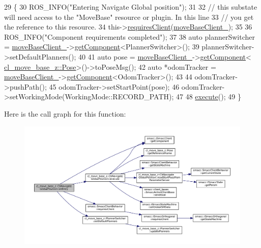 \begin{DoxyCode}
29     \{
30         ROS\_INFO(\textcolor{stringliteral}{"Entering Navigate Global position"});
31 
32         \textcolor{comment}{// this substate will need access to the "MoveBase" resource or plugin. In this line}
33         \textcolor{comment}{// you get the reference to this resource.}
34         this->\hyperlink{classsmacc_1_1SmaccClientBehavior_a917f001e763a1059af337bf4e164f542}{requiresClient}(\hyperlink{classcl__move__base__z_1_1CbNavigateGlobalPosition_a460d6b43834cb52baa94d22cd3a6fd2b}{moveBaseClient\_});
35 
36         ROS\_INFO(\textcolor{stringliteral}{"Component requirements completed"});
37 
38         \textcolor{keyword}{auto} plannerSwitcher = \hyperlink{classcl__move__base__z_1_1CbNavigateGlobalPosition_a460d6b43834cb52baa94d22cd3a6fd2b}{moveBaseClient\_}->\hyperlink{classsmacc_1_1ISmaccClient_adef78db601749ca63c19e74a27cb88cc}{getComponent}<PlannerSwitcher>();
39         plannerSwitcher->setDefaultPlanners();
40 
41         \textcolor{keyword}{auto} pose = \hyperlink{classcl__move__base__z_1_1CbNavigateGlobalPosition_a460d6b43834cb52baa94d22cd3a6fd2b}{moveBaseClient\_}->\hyperlink{classsmacc_1_1ISmaccClient_adef78db601749ca63c19e74a27cb88cc}{getComponent}<
      \hyperlink{classcl__move__base__z_1_1Pose}{cl\_move\_base\_z::Pose}>()->toPoseMsg();
42         \textcolor{keyword}{auto} *odomTracker = \hyperlink{classcl__move__base__z_1_1CbNavigateGlobalPosition_a460d6b43834cb52baa94d22cd3a6fd2b}{moveBaseClient\_}->\hyperlink{classsmacc_1_1ISmaccClient_adef78db601749ca63c19e74a27cb88cc}{getComponent}<OdomTracker>();
43 
44         odomTracker->pushPath();
45         odomTracker->setStartPoint(pose);
46         odomTracker->setWorkingMode(WorkingMode::RECORD\_PATH);
47 
48         \hyperlink{classcl__move__base__z_1_1CbNavigateGlobalPosition_a0b8525ea9e4388b27cb1f9b1e06a3b63}{execute}();
49     \}
\end{DoxyCode}
Here is the call graph for this function\+:
\nopagebreak
\begin{figure}[H]
\begin{center}
\leavevmode
\includegraphics[width=350pt]{classcl__move__base__z_1_1CbNavigateGlobalPosition_a66d8b0555ef2945bc108dcd5171be292_cgraph}
\end{center}
\end{figure}
